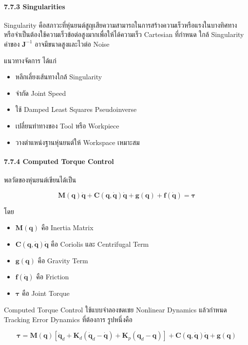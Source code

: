 \paragraph{7.7.3 Singularities}

Singularity คือสภาวะที่หุ่นยนต์สูญเสียความสามารถในการสร้างความเร็วหรือแรงในบางทิศทาง หรือจำเป็นต้องใช้ความเร็วข้อต่อสูงมากเพื่อให้ได้ความเร็ว Cartesian ที่กำหนด ใกล้ Singularity ค่าของ $\mathbf{J}^{-1}$ อาจมีขนาดสูงและไวต่อ Noise

แนวทางจัดการ ได้แก่

\begin{itemize}
    \item หลีกเลี่ยงเส้นทางใกล้ Singularity
    \item จำกัด Joint Speed
    \item ใช้ Damped Least Squares Pseudoinverse
    \item เปลี่ยนท่าทางของ Tool หรือ Workpiece
    \item วางตำแหน่งฐานหุ่นยนต์ให้ Workspace เหมาะสม
\end{itemize}

\paragraph{7.7.4 Computed Torque Control}

พลวัตของหุ่นยนต์เขียนได้เป็น

\[
\mathbf{M}(\mathbf{q})\ddot{\mathbf{q}}+\mathbf{C}(\mathbf{q},\dot{\mathbf{q}})\dot{\mathbf{q}}+\mathbf{g}(\mathbf{q})+\mathbf{f}(\dot{\mathbf{q}})=\boldsymbol{\tau}
\]

โดย

\begin{itemize}
    \item $\mathbf{M}(\mathbf{q})$ คือ Inertia Matrix
    \item $\mathbf{C}(\mathbf{q},\dot{\mathbf{q}})\dot{\mathbf{q}}$ คือ Coriolis และ Centrifugal Term
    \item $\mathbf{g}(\mathbf{q})$ คือ Gravity Term
    \item $\mathbf{f}(\dot{\mathbf{q}})$ คือ Friction
    \item $\boldsymbol{\tau}$ คือ Joint Torque
\end{itemize}

Computed Torque Control ใช้แบบจำลองชดเชย Nonlinear Dynamics แล้วกำหนด Tracking Error Dynamics ที่ต้องการ รูปหนึ่งคือ

\[
\boldsymbol{\tau}=\mathbf{M}(\mathbf{q})\left[\ddot{\mathbf{q}}_d+\mathbf{K}_d(\dot{\mathbf{q}}_d-\dot{\mathbf{q}})+\mathbf{K}_p(\mathbf{q}_d-\mathbf{q})\right]
+\mathbf{C}(\mathbf{q},\dot{\mathbf{q}})\dot{\mathbf{q}}+\mathbf{g}(\mathbf{q})
\]

